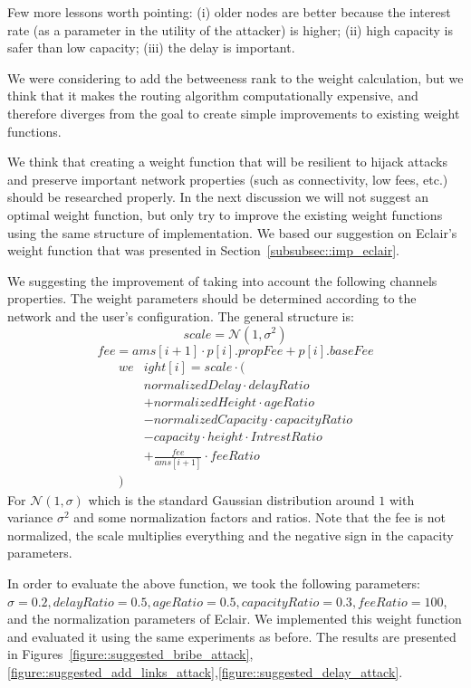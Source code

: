 Few more lessons worth pointing: (i) older nodes are better because the interest rate (as a parameter in the utility of the attacker) is higher; (ii) high capacity is safer than low capacity; (iii) the delay is important.

We were considering to add the betweeness rank to the weight calculation, 
but we think that it makes the routing algorithm computationally expensive, and therefore diverges 
from the goal to create simple improvements to existing weight functions.

We think that creating a weight function that will be resilient to hijack attacks and preserve important network properties (such as connectivity, low fees, etc.) should be researched properly. In the next discussion we will not suggest an optimal weight function, but only try to improve the existing weight functions using the same structure of implementation. We based our suggestion on Eclair's weight function that was presented in Section~\ref{subsubsec::imp_eclair}.

We suggesting the improvement of taking into account the following channels properties. 
The weight parameters should be determined according to the network and the user's configuration. The general structure is:
$$ scale = \mathcal{N}(1, \sigma^2) $$
$$ fee = ams[i+1] \cdot p[i].propFee + p[i].baseFee $$
\begin{align*}
 we&ight[i] = scale \cdot (\\
 &normalizedDelay \cdot delayRatio \\
 &+ normalizedHeight \cdot ageRatio \\
 &- normalizedCapacity \cdot capacityRatio \\
 &- capacity \cdot height \cdot IntrestRatio \\
 &+ \frac{fee}{ams[i+1]} \cdot feeRatio \\
 )
\end{align*}
For $\mathcal{N}(1, \sigma)$ which is the standard Gaussian distribution around $1$ 
with variance $\sigma^2$ and some normalization factors and ratios. Note that the fee is not normalized, the scale multiplies everything and the negative sign in the capacity parameters.

In order to evaluate 
the above function, we took the following parameters: $\sigma = 0.2, delayRatio=0.5, ageRatio=0.5, capacityRatio=0.3, feeRatio=100$, and the normalization parameters of Eclair.
We implemented this weight function and evaluated it using the same experiments as before. The results are presented in Figures~\ref{figure::suggested_bribe_attack},\ref{figure::suggested_add_links_attack},\ref{figure::suggested_delay_attack}. 

